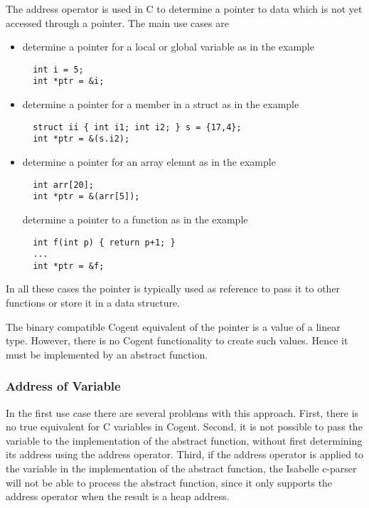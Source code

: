 The address operator \code{\&} is used in C to determine a pointer to data which is not yet accessed through a 
pointer. The main use cases are
\begin{itemize}
\item determine a pointer for a local or global variable as in the example
\begin{verbatim}
  int i = 5;
  int *ptr = &i;
\end{verbatim}

\item determine a pointer for a member in a struct as in the example
\begin{verbatim}
  struct ii { int i1; int i2; } s = {17,4};
  int *ptr = &(s.i2);
\end{verbatim}

\item determine a pointer for an array elemnt as in the example
\begin{verbatim}
  int arr[20];
  int *ptr = &(arr[5]);
\end{verbatim}

determine a pointer to a function as in the example
\begin{verbatim}
  int f(int p) { return p+1; }
  ...
  int *ptr = &f;
\end{verbatim}
\end{itemize}

In all these cases the pointer is typically used as reference to pass it to other functions or store it
in a data structure.

The binary compatible Cogent equivalent of the pointer is a value of a linear type. However, there is
no Cogent functionality to create such values. Hence it must be implemented by an abstract function.

\subsubsection{Address of Variable}

In the first use case there are several problems with this approach. First, there is no true equivalent
for C variables in Cogent. Second, it is not possible to pass the variable to the implementation of the
abstract function, without first determining its address using the address operator. Third, if the address
operator is applied to the variable in the implementation of the abstract function, the Isabelle c-parser
will not be able to process the abstract function, since it only supports the address operator when 
the result is a heap address.

